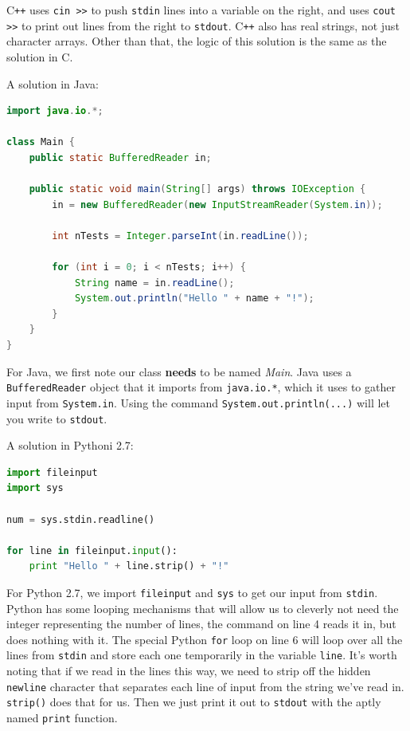 \documentclass[a4paper]{article}
\begin{document}
C\texttt{++} uses \texttt{cin >>} to push \texttt{stdin} lines into a variable on the right, and uses \texttt{cout >>} to print out lines from the right to \texttt{stdout}. C\texttt{++} also has real strings, not just character arrays. Other than that, the logic of this solution is the same as the solution in C.

A solution in Java:
\begin{lstlisting}[language=Java]
import java.io.*;

class Main {
    public static BufferedReader in;

    public static void main(String[] args) throws IOException {
        in = new BufferedReader(new InputStreamReader(System.in));

        int nTests = Integer.parseInt(in.readLine());

        for (int i = 0; i < nTests; i++) {
            String name = in.readLine();
            System.out.println("Hello " + name + "!");
        }
    }
}
\end{lstlisting}

For Java, we first note our class \textbf{needs} to be named \textit{Main}. Java uses a \texttt{BufferedReader} object that it imports from \texttt{java.io.*}, which it uses to gather input from \texttt{System.in}. Using the command \texttt{System.out.println(...)} will let you write to \texttt{stdout}.

A solution in Pythoni 2.7:
\begin{lstlisting}[language=Python]
import fileinput
import sys

num = sys.stdin.readline()

for line in fileinput.input():
    print "Hello " + line.strip() + "!"
\end{lstlisting}

For Python 2.7, we import \texttt{fileinput} and \texttt{sys} to get our input from \texttt{stdin}. Python has some looping mechanisms that will allow us to cleverly not need the integer representing the number of lines, the command on line 4 reads it in, but does nothing with it. The special Python \texttt{for} loop on line 6 will loop over all the lines from \texttt{stdin} and store each one temporarily in the variable \texttt{line}. It's worth noting that if we read in the lines this way, we need to strip off the hidden \texttt{newline} character that separates each line of input from the string we've read in. \texttt{strip()} does that for us. Then we just print it out to \texttt{stdout} with the aptly named \texttt{print} function.
\newpage
\end{document}
